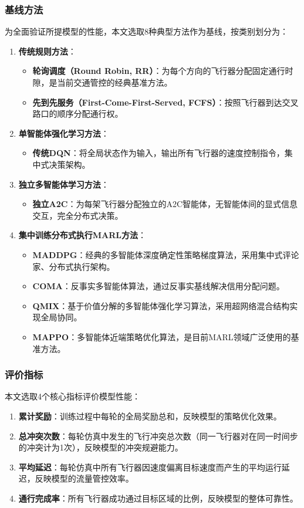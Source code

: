 \documentclass[12pt,a4paper,UTF8]{ctexart}
\begin{document}
\subsubsection{基线方法}
为全面验证所提模型的性能，本文选取8种典型方法作为基线\cite{ref2}，按类别划分为：
\begin{enumerate}[label=(\arabic*)]
    \item \textbf{传统规则方法}：
    \begin{itemize}
        \item \textbf{轮询调度（Round Robin, RR）}：为每个方向的飞行器分配固定通行时隙，是当前交通管控的经典基准方法。
        \item \textbf{先到先服务（First-Come-First-Served, FCFS）}：按照飞行器到达交叉路口的顺序分配通行权。
    \end{itemize}
    \item \textbf{单智能体强化学习方法}：
    \begin{itemize}
        \item \textbf{传统DQN}：将全局状态作为输入，输出所有飞行器的速度控制指令，集中式决策架构。
    \end{itemize}
    \item \textbf{独立多智能体学习方法}：
    \begin{itemize}
        \item \textbf{独立A2C}：为每架飞行器分配独立的A2C智能体，无智能体间的显式信息交互，完全分布式决策。
    \end{itemize}
    \item \textbf{集中训练分布式执行MARL方法}：
    \begin{itemize}
        \item \textbf{MADDPG}：经典的多智能体深度确定性策略梯度算法，采用集中式评论家、分布式执行架构。
        \item \textbf{COMA}：反事实多智能体算法，通过反事实基线解决信用分配问题。
        \item \textbf{QMIX}：基于价值分解的多智能体强化学习算法，采用超网络混合结构实现全局协同。
        \item \textbf{MAPPO}：多智能体近端策略优化算法，是目前MARL领域广泛使用的基准方法。
    \end{itemize}
\end{enumerate}

\subsubsection{评价指标}
本文选取4个核心指标评价模型性能：
\begin{enumerate}[label=(\arabic*)]
    \item \textbf{累计奖励}：训练过程中每轮的全局奖励总和，反映模型的策略优化效果。
    \item \textbf{总冲突次数}：每轮仿真中发生的飞行冲突总次数（同一飞行器对在同一时间步的冲突计为1次），反映模型的冲突规避能力。
    \item \textbf{平均延迟}：每轮仿真中所有飞行器因速度偏离目标速度而产生的平均运行延迟，反映模型的流量管控效率。
    \item \textbf{通行完成率}：所有飞行器成功通过目标区域的比例，反映模型的整体可靠性。
\end{enumerate}
\end{document}
